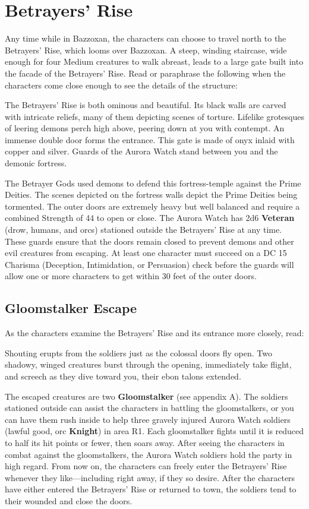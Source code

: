 \documentclass[10pt,a4,twoside,twocolumn,openany,nodeprecatedcode]{dndbook}
\begin{document}
\section{Betrayers' Rise}
Any time while in Bazzoxan, the characters can choose to travel north to the Betrayers' Rise, which looms over Bazzoxan.
A steep, winding staircase, wide enough for four Medium creatures to walk abreast, leads to a large gate built into the facade of the Betrayers' Rise. Read or paraphrase the following when the characters come close enough to see the details of the structure:
\begin{DndReadAloud}{}
The Betrayers' Rise is both ominous and beautiful. Its black walls are carved with intricate reliefs, many of them depicting scenes of torture. Lifelike grotesques of leering demons perch high above, peering down at you with contempt.
An immense double door forms the entrance. This gate is made of onyx inlaid with copper and silver. Guards of the Aurora Watch stand between you and the demonic fortress.
\end{DndReadAloud}

The Betrayer Gods used demons to defend this fortress-temple against the Prime Deities. The scenes depicted on the fortress walls depict the Prime Deities being tormented. The outer doors are extremely heavy but well balanced and require a combined Strength of 44 to open or close.
The Aurora Watch has 2d6 \textbf{Veteran} (drow, humans, and orcs) stationed outside the Betrayers' Rise at any time. These guards ensure that the doors remain closed to prevent demons and other evil creatures from escaping. At least one character must succeed on a DC 15 Charisma (Deception, Intimidation, or Persuasion) check before the guards will allow one or more characters to get within 30 feet of the outer doors.
\subsection{Gloomstalker Escape}
As the characters examine the Betrayers' Rise and its entrance more closely, read:
\begin{DndReadAloud}{}
Shouting erupts from the soldiers just as the colossal doors fly open. Two shadowy, winged creatures burst through the opening, immediately take flight, and screech as they dive toward you, their ebon talons extended.
\end{DndReadAloud}

The escaped creatures are two \textbf{Gloomstalker} (see appendix A). The soldiers stationed outside can assist the characters in battling the gloomstalkers, or you can have them rush inside to help three gravely injured Aurora Watch soldiers (lawful good, orc \textbf{Knight}) in area R1.
Each gloomstalker fights until it is reduced to half its hit points or fewer, then soars away. After seeing the characters in combat against the gloomstalkers, the Aurora Watch soldiers hold the party in high regard. From now on, the characters can freely enter the Betrayers' Rise whenever they like—including right away, if they so desire. After the characters have either entered the Betrayers' Rise or returned to town, the soldiers tend to their wounded and close the doors.
\end{document}
